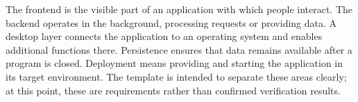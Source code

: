 \begin{beginnerstatement}

The frontend is the visible part of an application with which people interact.
The backend operates in the background, processing requests or providing data.
A desktop layer connects the application to an operating system and enables
additional functions there. Persistence ensures that data remains available
after a program is closed. Deployment means providing and starting the
application in its target environment. The template is intended to separate
these areas clearly; at this point, these are requirements rather than
confirmed verification results.

\end{beginnerstatement}
